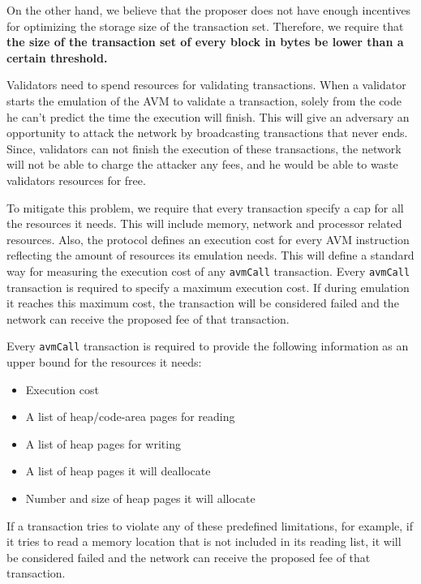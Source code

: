 \documentclass[11pt, A4]{article}
\begin{document}
    On the other hand, we believe that the proposer does not have enough incentives for optimizing the storage size
    of the transaction set. Therefore, we require that \textbf{the size of the transaction set of every block in
    bytes be lower than a certain threshold.}

    Validators need to spend resources for validating transactions. When a validator starts the emulation of the AVM
    to validate a transaction, solely from the code he can't predict the time the execution will finish. This will
    give an adversary an opportunity to attack the network by broadcasting transactions that never ends. Since,
    validators can not finish the execution of these transactions, the network will not be able to charge the
    attacker any fees, and he would be able to waste validators resources for free.

    To mitigate this problem, we require that every transaction specify a cap for all the resources it needs. This
    will include memory, network and processor related resources. Also, the protocol defines an execution cost for
    every AVM instruction reflecting the amount of resources its emulation needs. This will define a standard way for
    measuring the execution cost of any \texttt{avmCall} transaction. Every \texttt{avmCall} transaction is required
    to specify a maximum execution cost. If during emulation it reaches this maximum cost, the transaction will be
    considered failed and the network can receive the proposed fee of that transaction.

    Every \texttt{avmCall} transaction is required to provide the following information as an upper bound for the
    resources it needs:

    \begin{itemize}
        \item Execution cost
        \item A list of heap/code-area pages for reading
        \item A list of heap pages for writing
        \item A list of heap pages it will deallocate
        \item Number and size of heap pages it will allocate
    \end{itemize}

    If a transaction tries to violate any of these predefined limitations, for example, if it tries to read a memory
    location that is not included in its reading list, it will be considered failed and the network can receive the
    proposed fee of that transaction.
\end{document}
